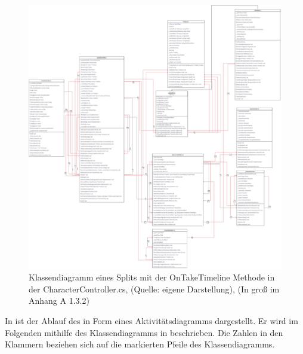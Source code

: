 \begin{figure}[ht]
\centering
\includegraphics[width=1\linewidth]{content/pictures/Split_Class.jpg}
\caption{Klassendiagramm eines Splits mit der OnTakeTimeline Methode in der CharacterController.cs, (Quelle: eigene Darstellung), (In groß im Anhang A 1.3.2)}
\label{fig:split-class}
\end{figure}

In  ist der Ablauf des  in Form eines Aktivitätsdiagramms dargestellt. Er wird im Folgenden mithilfe des Klassendiagramms in  beschrieben. Die Zahlen in den Klammern beziehen sich auf die markierten Pfeile des Klassendiagramms.


